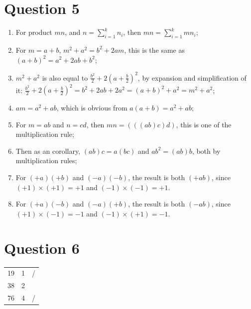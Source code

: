 \documentclass{article}
\begin{document}
\newpage

\section*{Question 5}

\begin{enumerate}
    \item For product $mn$, and $n=\sum^{k}_{i=1}n_i$, then $mn=\sum^{k}_{i=1}mn_i$;
    \item For $m=a+b$, $m^2+a^2=b^2+2am$, this is the same as $(a+b)^2=a^2+2ab+b^2$;
    \item $m^2+a^2$ is also equal to $\frac{b^2}{2}+2(a+\frac{b}{2})^2$, by expansion and simplification of it: $\frac{b^2}{2}+2(a+\frac{b}{2})^2=b^2+2ab+2a^2=(a+b)^2+a^2=m^2+a^2$;
    \item $am=a^2+ab$, which is obvious from $a(a+b)=a^2+ab$;
    \item For $m=ab$ and $n=cd$, then $mn= (((ab)c)d)$, this is one of the multiplication rule;
    \item Then as an corollary, $(ab)c=a(bc)$ and $ab^2=(ab)b$, both by multiplication rules;
    \item For $(+a)(+b)$ and $(-a)(-b)$, the result is both $(+ab)$, since $(+1)\times (+1)=+1$ and $(-1)\times (-1)=+1$.
    \item For $(+a)(-b)$ and $(-a)(+b)$, the result is both $(-ab)$, since $(+1)\times (-1)=-1$ and $(-1)\times (+1)=-1$.
\end{enumerate}
\newpage
\section*{Question 6}

\begin{center}
\begin{tabular}{ccc}
        19&  1&/\\
        38 & 2&\\
        76&4&/\\
\end{tabular}

\end{center}
\end{document}
